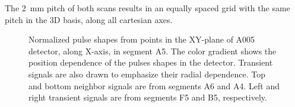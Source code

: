 The 2~mm pitch of both scans results in an equally spaced grid with the same pitch in the 3D basis, along all cartesian axes.



\begin{figure}
\centering
{}
\caption{Normalized pulse shapes from points in the XY-plane of A005 detector, along X-axis, in segment A5. The color gradient shows the position dependence of the pulses shapes in the detector. Transient signals are also drawn to emphasize their radial dependence. Top and bottom neighbor signals are from segments A6 and A4. Left and right transient signals are from segments F5 and B5, respectively.}
\label{fig:neighbors_Ycst}
\end{figure}

